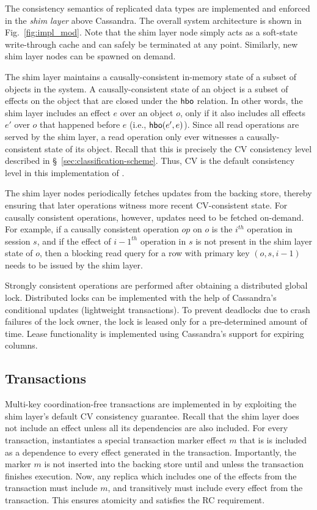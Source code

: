 The consistency semantics of replicated data types are implemented and
enforced in the \emph{shim layer} above Cassandra. The overall system
architecture is shown in Fig.~\ref{fig:impl_mod}. Note that the shim
layer node simply acts as a soft-state write-through cache and can
safely be terminated at any point. Similarly, new shim layer nodes can
be spawned on demand.

The shim layer maintains a causally-consistent
 in-memory state of a subset of objects in the system.
A causally-consistent state of an object is a subset of effects on the
object that are closed under the ${\normalfont \textsf{hbo}}$ relation. In other words,
the shim layer includes an effect $e$ over an object $o$, only if it
also includes all effects $e'$ over $o$ that happened before $e$ (i.e.,
${\normalfont \textsf{hbo}(e',e)}$). Since all read operations are served by the shim
layer, a read operation only ever witnesses a causally-consistent state of its
object. Recall that this is precisely the CV consistency level
described in \S~\ref{sec:classification-scheme}. Thus, CV is the
default consistency level in this implementation of \name.

The shim layer nodes periodically fetches updates from the backing
store, thereby ensuring that later operations witness more recent
CV-consistent state. For causally consistent operations, however,
updates need to be fetched on-demand. For example, if a causally
consistent operation $op$ on $o$ is the $i^{th}$ operation in session
$s$, and if the effect of ${i-1}^{th}$ operation in $s$ is not present
in the shim layer state of $o$, then a blocking read query for a row
with primary key $(o,s,i-1)$ needs to be issued by the shim layer.

Strongly consistent operations are performed after obtaining a
distributed global lock. Distributed locks can be implemented with the
help of Cassandra's conditional updates (lightweight transactions). To
prevent deadlocks due to crash failures of the lock owner, the lock is
leased only for a pre-determined amount of time. Lease functionality
is implemented using Cassandra's support for expiring columns.

\subsection{Transactions}

Multi-key coordination-free transactions are implemented in \name by
exploiting the shim layer's default CV consistency guarantee. Recall that
the shim layer does not include an effect unless all its
dependencies are also included. For every transaction, \name
instantiates a special transaction marker effect $m$ that is is
included as a dependence to every effect generated in the transaction.
Importantly, the marker $m$ is not inserted into the backing store
until and unless the transaction finishes execution. Now, any replica
which includes one of the effects from the transaction must include
$m$, and transitively must include every effect from the transaction.
This ensures atomicity and satisfies the RC requirement.

